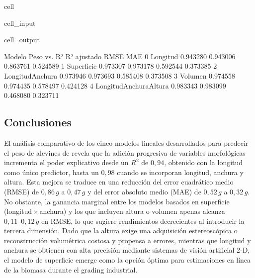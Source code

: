 \documentclass[a4paper,10pt,spanish]{jupyterBook}
\begin{document}
\begin{sphinxuseclass}{cell}
\begin{sphinxVerbatimInput}
\begin{sphinxuseclass}{cell_input}
\end{sphinxuseclass}\end{sphinxVerbatimInput}
\begin{sphinxVerbatimOutput}

\begin{sphinxuseclass}{cell_output}
\begin{sphinxVerbatim}[commandchars=\\\{\}]
           Modelo Peso vs.        R²  R² ajustado      RMSE       MAE
0                 Longitud  0.943280     0.943006  0.863761  0.524589
1               Superficie  0.973307     0.973178  0.592544  0.373385
2         Longitud\PYGZhy{}Anchura  0.973946     0.973693  0.585408  0.373508
3                  Volumen  0.974558     0.974435  0.578497  0.424128
4  Longitud\PYGZhy{}Anchura\PYGZhy{}Altura  0.983343     0.983099  0.468080  0.323711
\end{sphinxVerbatim}

\end{sphinxuseclass}\end{sphinxVerbatimOutput}

\end{sphinxuseclass}

\subsection{Conclusiones}
\label{\detokenize{content/03/Coeficientes:conclusiones}}
\sphinxAtStartPar
El análisis comparativo de los cinco modelos lineales desarrollados para predecir el peso de alevines de  revela que la adición progresiva de variables morfológicas incrementa el poder explicativo desde un \(R^{2}\) de \(0,94\), obtenido con la longitud como único predictor, hasta un \(0,98\) cuando se incorporan longitud, anchura y altura. Esta mejora se traduce en una reducción del error cuadrático medio (RMSE) de \(0,86\,g\) a \(0,47\,g\) y del error absoluto medio (MAE) de \(0,52\,g\) a \(0,32\,g\). No obstante, la ganancia marginal entre los modelos basados en superficie (longitud × anchura) y los que incluyen altura o volumen apenas alcanza \(0,11–0,12\,g\) en RMSE, lo que sugiere rendimientos decrecientes al introducir la tercera dimensión. Dado que la altura exige una adquisición estereoscópica o reconstrucción volumétrica costosa y propensa a errores, mientras que longitud y anchura se obtienen con alta precisión mediante sistemas de visión artificial 2‑D, el modelo de superficie emerge como la opción óptima para estimaciones en línea de la biomasa durante el grading industrial.
\end{document}
